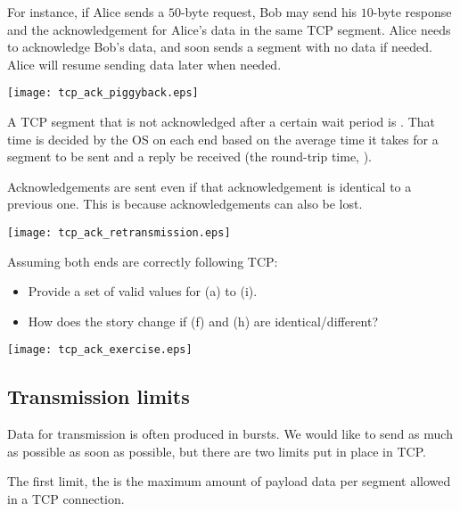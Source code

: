 For instance, if Alice sends a $50$-byte request, Bob may send his $10$-byte response
and the acknowledgement for Alice's data in the same TCP segment. Alice needs to acknowledge 
Bob's data, and soon sends a segment with no data if needed. Alice will resume sending 
data later when needed.

\begin{center}
\texttt{[image: tcp\_ack\_piggyback.eps]}
\end{center}

A TCP segment that is not acknowledged after a certain wait period is 
. That time is decided by the OS on each end
based on the average time it takes for a segment to be sent and a reply be received 
(the round-trip time, ).

Acknowledgements are sent even if that acknowledgement is identical to a previous one. This is because 
acknowledgements can also be lost.

\begin{center}
\texttt{[image: tcp\_ack\_retransmission.eps]}
\end{center}


\begin{exercise}
Assuming both ends are correctly following TCP:
\begin{itemize}
 \item Provide a set of valid values for (a) to (i).
 \item How does the story change if (f) and (h) are identical/different?
\end{itemize}

\begin{center}
\texttt{[image: tcp\_ack\_exercise.eps]}
\end{center}
\end{exercise}

\subsection{Transmission limits}

Data for transmission is often produced in bursts. We would like to send as much 
as possible as soon as possible, but there are two limits put in place in TCP.

The first limit, the  is the maximum amount of payload data
per segment allowed in a TCP connection. 

